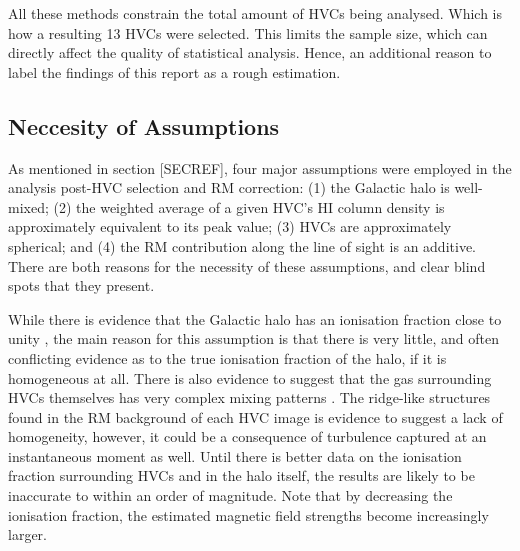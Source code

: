 All these methods constrain the total amount of HVCs being analysed. Which is how a resulting 13 HVCs were selected. This limits the sample size, which can directly affect the quality of statistical analysis. Hence, an additional reason to label the findings of this report as a rough estimation.

\subsection{Neccesity of Assumptions}
\label{ssec:B2}

As mentioned in section [SECREF], four major assumptions were employed in the analysis post-HVC selection and RM correction: (1) the Galactic halo is well-mixed; (2) the weighted average of a given HVC's HI column density is approximately equivalent to its peak value; (3) HVCs are approximately spherical; and (4) the RM contribution along the line of sight is an additive. There are both reasons for the necessity of these assumptions, and clear blind spots that they present.


While there is evidence that the Galactic halo has an ionisation fraction close to unity \citep{ID23}, the main reason for this assumption is that there is very little, and often conflicting evidence as to the true ionisation fraction of the halo, if it is homogeneous at all. There is also evidence to suggest that the gas surrounding HVCs themselves has very complex mixing patterns \cite{ID69}. The ridge-like structures found in the RM background of each HVC image is evidence to suggest a lack of homogeneity, however, it could be a consequence of turbulence captured at an instantaneous moment as well. Until there is better data on the ionisation fraction surrounding HVCs and in the halo itself, the results are likely to be inaccurate to within an order of magnitude. Note that by decreasing the ionisation fraction, the estimated magnetic field strengths become increasingly larger.


